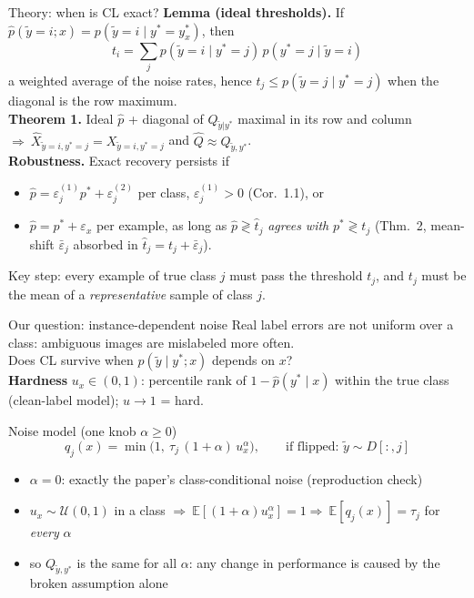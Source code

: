 \documentclass[aspectratio=169,10pt]{beamer}
\newcommand{\Qyy}{Q_{\tilde y,y^*}}
\newcommand{\E}{\mathbb{E}}
\begin{document}
\begin{frame}{Theory: when is CL exact?}
  \textbf{Lemma (ideal thresholds).} If $\hat p(\tilde y=i;x)=p(\tilde y=i\mid y^*=y^*_x)$, then
  \[ t_i=\sum_{j}p(\tilde y=i\mid y^*=j)\,p(y^*=j\mid\tilde y=i) \]
  a weighted average of the noise rates, hence $t_j\le p(\tilde y=j\mid y^*=j)$ when the diagonal is the row maximum.\\[4pt]
  \textbf{Theorem 1.} Ideal $\hat p$ + diagonal of $Q_{\tilde y|y^*}$ maximal in its row and column $\Rightarrow\ \hat X_{\tilde y=i,y^*=j}=X_{\tilde y=i,y^*=j}$ and $\hat Q\approx\Qyy$.\\[4pt]
  \textbf{Robustness.} Exact recovery persists if
  \begin{itemize}
    \item $\hat p=\varepsilon^{(1)}_jp^*+\varepsilon^{(2)}_j$ per class, $\varepsilon^{(1)}_j>0$ (Cor.\ 1.1), or
    \item $\hat p=p^*+\varepsilon_x$ per example, as long as $\hat p\gtrless\hat t_j$ \emph{agrees with} $p^*\gtrless t_j$ (Thm.\ 2, mean-shift $\bar\varepsilon_j$ absorbed in $\hat t_j=t_j+\bar\varepsilon_j$).
  \end{itemize}
  \alert{Key step:} every example of true class $j$ must pass the threshold $t_j$, and $t_j$ must be the mean of a \emph{representative} sample of class $j$.
\end{frame}

\begin{frame}{Our question: instance-dependent noise}
  Real label errors are not uniform over a class: ambiguous images are mislabeled more often.\\
  \alert{Does CL survive when $p(\tilde y\mid y^*;x)$ depends on $x$?}\\[6pt]
  \textbf{Hardness} $u_x\in(0,1)$: percentile rank of $1-\hat p(y^*\!\mid x)$ within the true class (clean-label model); $u\to1$ = hard.\\[4pt]
  \begin{block}{Noise model (one knob $\alpha\ge0$)}
    \[
      q_j(x)=\min\!\bigl(1,\ \tau_j\,(1+\alpha)\,u_x^{\alpha}\bigr),\qquad
      \text{if flipped: } \tilde y\sim D[:,j]
    \]
  \end{block}
  \begin{itemize}
    \item $\alpha=0$: exactly the paper's class-conditional noise (reproduction check)
    \item $u_x\sim\mathcal U(0,1)$ in a class $\Rightarrow\ \E[(1+\alpha)u_x^{\alpha}]=1\Rightarrow\ \E[q_j(x)]=\tau_j$ for \emph{every} $\alpha$
    \item so $\Qyy$ is the same for all $\alpha$: any change in performance is caused by the broken assumption alone
  \end{itemize}
\end{frame}
\end{document}
